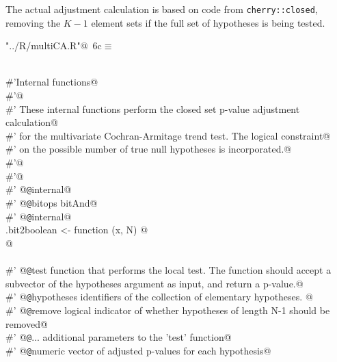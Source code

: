 \documentclass[reqno]{amsart}
\renewcommand{\NWtarget}[2]{\hypertarget{#1}{#2}}
\begin{document}
The actual adjustment calculation is based on code from \texttt{cherry::closed}, removing
the $K-1$ element sets if the full set of hypotheses is being tested.

\begin{flushleft} \small\label{scrap11}\raggedright\small
\NWtarget{nuweb6c}{} \verb@"../R/multiCA.R"@\nobreak\ {\footnotesize {6c}}$\equiv$
\vspace{-1ex}
\begin{list}{}{} \item
\mbox{}\verb@@\\
\mbox{}\verb@#'Internal functions@\\
\mbox{}\verb@#'@\\
\mbox{}\verb@#' These internal functions perform the closed set p-value adjustment calculation@\\
\mbox{}\verb@#' for the multivariate Cochran-Armitage trend test. The logical constraint@\\
\mbox{}\verb@#' on the possible number of true null hypotheses is incorporated.@\\
\mbox{}\verb@#'@\\
\mbox{}\verb@#'@\\
\mbox{}\verb@#' @{\tt @}\verb@name internal@\\
\mbox{}\verb@#' @{\tt @}\verb@importFrom bitops bitAnd@\\
\mbox{}\verb@#' @{\tt @}\verb@keywords internal@\\
\mbox{}\verb@.bit2boolean <- function (x, N) @\\
\mbox{}@\\
\mbox{}\verb@@\\
\mbox{}\verb@#' @{\tt @}\verb@param test function that performs the local test. The function should accept a subvector of the hypotheses argument as input, and return a p-value.@\\
\mbox{}\verb@#' @{\tt @}\verb@param  hypotheses identifiers of the collection of elementary hypotheses. @\\
\mbox{}\verb@#' @{\tt @}\verb@param remove logical indicator of whether hypotheses of length N-1 should be removed@\\
\mbox{}\verb@#' @{\tt @}\verb@param  ...  additional parameters to the 'test' function@\\
\mbox{}\verb@#' @{\tt @}\verb@return  numeric vector of adjusted p-values for each hypothesis@\\

\end{list}
\end{flushleft}
\end{document}

